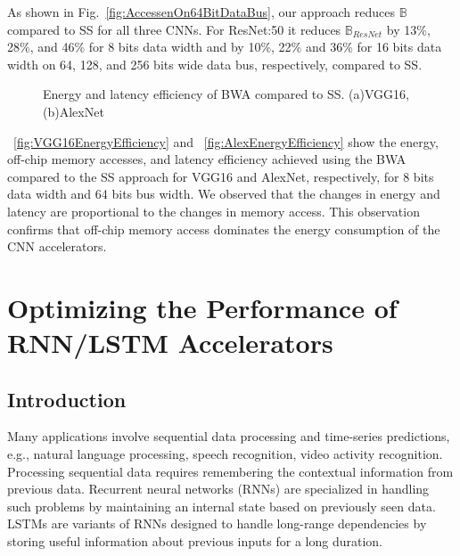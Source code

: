 \documentclass[a4paper,10pt]{article}
\newcommand{\numBytesOffChip}{\mathbb{B}}
\begin{document}
As shown in Fig.~\ref{fig:AccessenOn64BitDataBus}, our approach reduces $\numBytesOffChip$ compared to SS for all three CNNs. For ResNet:50 it reduces $\numBytesOffChip_{ResNet}$ by 13\%, 28\%, and 46\% for 8 bits data width and by 10\%, 22\% and 36\% for 16 bits data width on 64, 128, and 256 bits wide data bus, respectively, compared to SS.
\begin{figure}[!htb]
	\centering
    \captionsetup{font=sf}	
	\hfil
	\hfil
	\caption{Energy and latency efficiency of BWA compared to SS. (a)VGG16, (b)AlexNet}
	\label{fig:EffectOnLatency}
\end{figure}

\figurename{~\ref{fig:VGG16EnergyEfficiency}} and \figurename{~\ref{fig:AlexEnergyEfficiency}} show the energy, off-chip memory accesses, and latency efficiency achieved using the BWA compared to the SS approach for VGG16 and AlexNet, respectively, for 8 bits data width and 64 bits bus width. We observed that the changes in energy and latency are proportional to the changes in memory access. This observation confirms that off-chip memory access dominates the energy consumption of the CNN accelerators.
\section{Optimizing the Performance of RNN/LSTM Accelerators}
\subsection{Introduction}
Many applications involve sequential data processing and time-series predictions, e.g., natural language processing, speech recognition, video activity recognition. Processing sequential data requires remembering the contextual information from previous data. Recurrent neural networks (RNNs) are specialized in handling such problems by maintaining an internal state based on previously seen data. LSTMs \cite{hochreiter1997long} are variants of RNNs designed to handle long-range dependencies by storing useful information about previous inputs for a long duration. 
\end{document}

